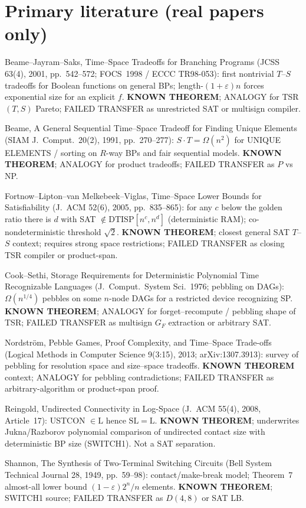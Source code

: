 \documentclass[11pt]{article}
\begin{document}
\section*{Primary literature (real papers only)}
Beame--Jayram--Saks, Time--Space Tradeoffs for Branching Programs (JCSS 63(4), 2001, pp.~542--572;
FOCS~1998 / ECCC TR98-053): first nontrivial $T$--$S$ tradeoffs for Boolean functions on general BPs;
length-$(1+\varepsilon)n$ forces exponential size for an explicit $f$. \textbf{KNOWN THEOREM}; ANALOGY for TSR $(T,S)$ Pareto; FAILED TRANSFER as unrestricted SAT or multisign compiler.

Beame, A General Sequential Time--Space Tradeoff for Finding Unique Elements (SIAM J.\ Comput.\ 20(2), 1991, pp.~270--277): $S\cdot T=\Omega(n^2)$ for UNIQUE ELEMENTS / sorting on $R$-way BPs and fair sequential models. \textbf{KNOWN THEOREM}; ANALOGY for product tradeoffs; FAILED TRANSFER as $P$ vs NP.

Fortnow--Lipton--van Melkebeek--Viglas, Time--Space Lower Bounds for Satisfiability (J.\ ACM 52(6), 2005, pp.~835--865): for any $c$ below the golden ratio there is $d$ with SAT $\notin\mathrm{DTISP}[n^c,n^d]$ (deterministic RAM); co-nondeterministic threshold $\sqrt{2}$. \textbf{KNOWN THEOREM}; closest general SAT $T$--$S$ context; requires strong space restrictions; FAILED TRANSFER as closing TSR compiler or product-span.

Cook--Sethi, Storage Requirements for Deterministic Polynomial Time Recognizable Languages (J.\ Comput.\ System Sci.\ 1976; pebbling on DAGs): $\Omega(n^{1/4})$ pebbles on some $n$-node DAGs for a restricted device recognizing SP. \textbf{KNOWN THEOREM}; ANALOGY for forget--recompute / pebbling shape of TSR; FAILED TRANSFER as multisign $G_F$ extraction or arbitrary SAT.

Nordstr\"om, Pebble Games, Proof Complexity, and Time--Space Trade-offs (Logical Methods in Computer Science 9(3:15), 2013; arXiv:1307.3913): survey of pebbling for resolution space and size--space tradeoffs. \textbf{KNOWN THEOREM} context; ANALOGY for pebbling contradictions; FAILED TRANSFER as arbitrary-algorithm or product-span proof.

Reingold, Undirected Connectivity in Log-Space (J.\ ACM 55(4), 2008, Article~17): USTCON $\in\mathrm{L}$ hence $\mathrm{SL}=\mathrm{L}$. \textbf{KNOWN THEOREM}; underwrites Jukna/Razborov polynomial comparison of undirected contact size with deterministic BP size (SWITCH1). Not a SAT separation.

Shannon, The Synthesis of Two-Terminal Switching Circuits (Bell System Technical Journal 28, 1949, pp.~59--98): contact/make-break model; Theorem~7 almost-all lower bound $(1-\varepsilon)2^n/n$ elements. \textbf{KNOWN THEOREM}; SWITCH1 source; FAILED TRANSFER as $D(4,8)$ or SAT LB.
\end{document}
